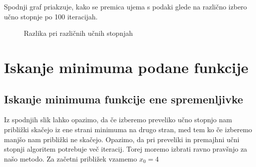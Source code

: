 \documentclass{article}
\begin{document}
Spodnji graf priakzuje, kako se premica ujema s podaki glede na različno izbero učno stopnje po 100 iteracijah.
\begin{figure}
    \centering

    \caption{Razlika pri različnih učnih stopnjah}
    \label{fig:foobar}
\end{figure}




\section{Iskanje minimuma podane funkcije}
\subsection{Iskanje minimuma funkcije ene spremenljivke}

Iz spodnjih slik lahko opazimo, da če izberemo preveliko učno stopnjo nam približki skačejo iz ene strani minimuma na drugo stran, med tem ko če izberemo manjšo nam približki ne skačejo. Opazimo, da pri preveliki in premajhni učni stopnji algoritem potrebuje več iteracij. Torej moremo izbrati ravno pravšnjo za našo metodo. Za začetni približek vzamemo $x_0 = 4$
\end{document}
